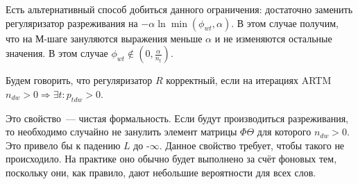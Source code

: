 \documentclass[12pt, twoside]{article}
\begin{document}
Есть альтернативный способ добиться данного ограничения: достаточно заменить регуляризатор разреживания на $-\alpha \ln \min(\phi_{wt}, \alpha)$. В этом случае получим, что на М-шаге зануляются выражения меньше $\alpha$ и не изменяются остальные значения. В этом случае $\phi_{wt}\notin (0, \frac{\alpha}{n_t})$.

\begin{Definition}
\label{fairreg}
Будем говорить, что регуляризатор $R$ корректный, если на итерациях ARTM $n_{dw} > 0 \Rightarrow \exists t\colon p_{tdw} > 0$.
\end{Definition}

Это свойство~--- чистая формальность. Если будут производиться разреживания, то необходимо случайно не занулить элемент матрицы $\Phi \Theta$ для которого $n_{dw} > 0$. Это привело бы к падению $L$ до -$\infty$.  Данное свойство требует, чтобы такого не происходило. На практике оно обычно будет выполнено за счёт фоновых тем\cite{vorontsov2014tutorial}, поскольку они, как правило, дают небольшие вероятности для всех слов.
\end{document}
